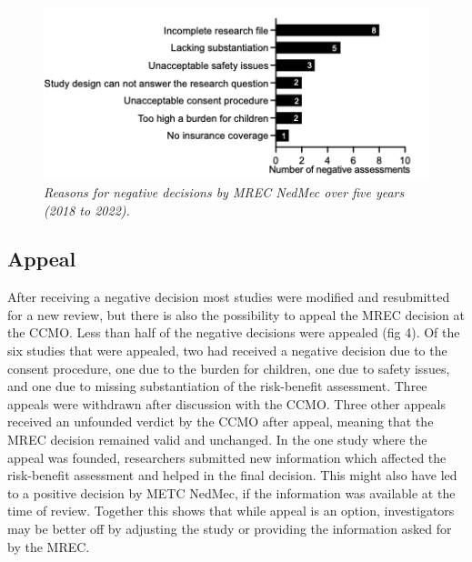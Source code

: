 \documentclass[authordate, meta, issue]{jote-new-article}
\begin{document}
\begin{figure}
  \begin{fullwidth}
    \includegraphics[width=\linewidth]{media/Picture3.png}

    \caption{\emph{Reasons for negative decisions by MREC NedMec over five years (2018 to 2022).}}

    \label{fig:rId13}

  \end{fullwidth}
\end{figure}


\subsection{Appeal}



After receiving a negative decision most studies were modified and resubmitted for a new review, but there is also the possibility to appeal the MREC decision at the CCMO. Less than half of the negative decisions were appealed (fig 4). Of the six studies that were appealed, two had received a negative decision due to the consent procedure, one due to the burden for children, one due to safety issues, and one due to missing substantiation of the risk-benefit assessment. Three appeals were withdrawn after discussion with the CCMO. Three other appeals received an unfounded verdict by the CCMO after appeal, meaning that the MREC decision remained valid and unchanged. In the one study where the appeal was founded, researchers submitted new information which affected the risk-benefit assessment and helped in the final decision. This might also have led to a positive decision by METC NedMec, if the information was available at the time of review. Together this shows that while appeal is an option, investigators may be better off by adjusting the study or providing the information asked for by the MREC.
\end{document}
